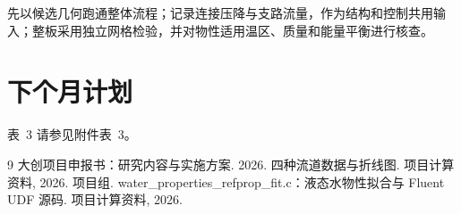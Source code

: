 \documentclass[stage2,fontset=fandol]{ydzjreport}
\makeatletter
\newcommand{\submissionnumber}[1]{\def\@currentlabel{#1}}
\makeatother
\begin{document}
先以候选几何跑通整体流程；记录连接压降与支路流量，作为结构和控制共用输入；整板采用独立网格检验，并对物性适用温区、质量和能量平衡进行核查。

\section{下个月计划}


\par\noindent \begingroup\submissionnumber{3}\label{tab:plan}\endgroup 表~3 请参见附件表~3。\par




\begin{thebibliography}{9}
 大创项目申报书：研究内容与实施方案. 2026.
 四种流道数据与折线图. 项目计算资料, 2026.
 项目组. water\_properties\_refprop\_fit.c：液态水物性拟合与 Fluent UDF 源码. 项目计算资料, 2026.
\end{thebibliography}
\end{document}
